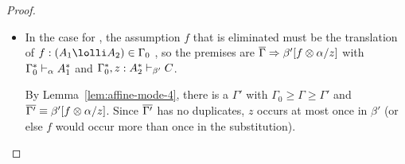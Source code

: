 \begin{proof}
\begin{itemize}
  We distinguish cases on whether $z$ (which is only known to be in
  $\Gamma_0$) is bound in $\Gamma$ or not.  

  If it is, then $\vars{\Gamma}[(x \otimes y)/z] \deq
  (\vars{\Gamma}-z)\otimes x \otimes y$, and since
  $\Gamma_0^-z,x:A_1,y:A_2 \ge \Gamma-z,x:A_1,y:A_2$, we get
   by the inductive hypothesis, and can
  apply $\otimes$-left.

  If it is not, then $\vars{\Gamma}[(x \otimes y)/z] \deq
  \vars{\Gamma}$.  Because $\Gamma_0 \ge \Gamma$ by assumption,
  ${\Gamma_0-z,x:A_1,y:A_2} \ge \Gamma$ (it removes something not in
  $\Gamma$, and adds two things).  Using the equality, the premise derives
  ,
  so we get  directly by the inductive hypothesis.  
  In this case, the given proof does a left rule on a ``0-use''
  variable that does not occur in the context descriptor, which adds
  some additional 0-use assumptions to the context.  The inductive
  hypothesis is compatible with this, and returning its result
  drops this step.    

\item In the case for \UL, the assumption $f$ that is eliminated must be
  the translation of $f:(A_1 \lolli A_2) \in \Gamma_0$ , so the premises
  are $\overline{\Gamma} \Rightarrow \beta'[f \otimes \alpha/z]$ with
  $\Gamma_0^* \vdash_{\alpha} A_1^*$ and
  $\Gamma_0^*,z:A_2^* \vdash_{\beta'} C$.

  By Lemma~\ref{lem:affine-mode-4}, there is a $\Gamma'$ with $\Gamma_0
  \ge \Gamma \ge \Gamma'$ and $\overline{\Gamma'} \equiv \beta'[f \otimes
    \alpha/z]$.  Since $\overline{\Gamma'}$ has no duplicates, $z$ occurs at
  most once in $\beta'$ (or else $f$ would occur more than once in the
  substitution).
  


\end{itemize}
\end{proof}
